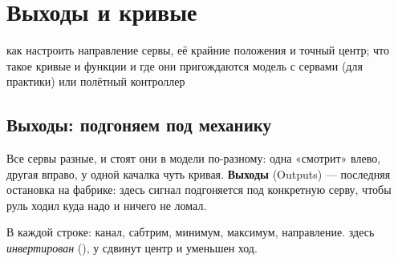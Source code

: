 \chapter{Выходы и кривые}
\label{ch:outputs}
\chapterintro
  {как настроить направление сервы, её крайние положения и точный центр; что такое кривые
   и функции и где они пригождаются}
  {модель с сервами (для практики) или полётный контроллер}

\section{Выходы: подгоняем под механику}

\begin{simple}
Все сервы разные, и стоят они в модели по-разному: одна «смотрит» влево, другая вправо,
у одной качалка чуть кривая. \textbf{Выходы} (Outputs) --- последняя остановка на фабрике:
здесь сигнал подгоняется под конкретную серву, чтобы руль ходил куда надо и ничего
не ломал.
\end{simple}

\begin{center}
\end{center}

В каждой строке: канал, сабтрим, минимум, максимум, направление.  здесь
\emph{инвертирован} (), у  сдвинут центр и уменьшен ход.

